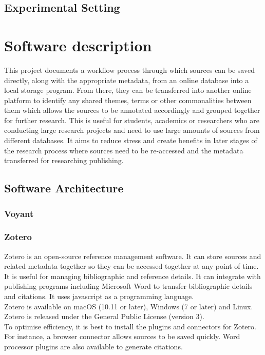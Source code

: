 \documentclass[preprint,12pt, a4paper]{elsarticle}
\begin{document}
\subsection{Experimental Setting}

\section{Software description}
\label{}
This project documents a workflow process through which sources can be saved directly, along with the appropriate metadata, from an online database into a local storage program. From there, they can be transferred into another online platform to identify any shared themes, terms or other commonalities between them which allows the sources to be annotated accordingly and grouped together for further research. This is useful for students, academics or researchers who are conducting large research projects and need to use large amounts of sources from different databases. It aims to reduce stress and create benefits in later stages of the research process where sources need to be re-accessed and the metadata transferred for researching publishing. 

\subsection{Software Architecture}
\label{}
\subsubsection{Voyant}

\subsubsection{Zotero}
Zotero is an open-source reference management software. It can store sources and related metadata together so they can be accessed together at any point of time. It is useful for managing bibliographic and reference details. It can integrate with publishing programs including Microsoft Word to transfer bibliographic details and citations. It uses javascript as a programming language.\\
Zotero is available on macOS (10.11 or later), Windows (7 or later) and Linux. Zotero is released under the General Public License (version 3).\\
To optimise efficiency, it is best to install the plugins and connectors for Zotero. For instance, a browser connector allows sources to be saved quickly. Word processor plugins are also available to generate citations.
\end{document}
